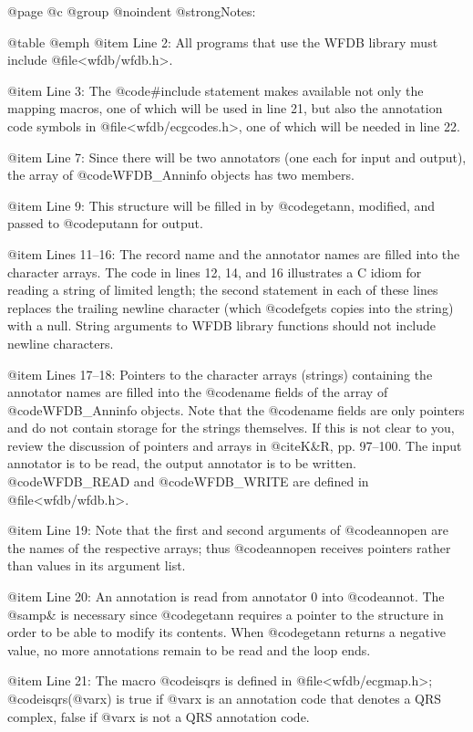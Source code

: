 {{{{{{{{{{@page
@c @group
@noindent
@strong{Notes:}

@table @emph
@item Line 2:
All programs that use the WFDB library must include
@file{<wfdb/wfdb.h>}.

@item Line 3:
The @code{#include} statement makes available not only the mapping
macros, one of which will be used in line 21, but also the
annotation code symbols in @file{<wfdb/ecgcodes.h>}, one of which
will be needed in line 22.

@item Line 7:
Since there will be two annotators (one each for input and output),
the array of @code{WFDB_Anninfo} objects has two members.

@item Line 9:
This structure will be filled in by @code{getann}, modified, and passed
to @code{putann} for output.

@item Lines 11--16:
The record name and the annotator names are filled into the character
arrays.  The code in lines 12, 14, and 16 illustrates a C idiom for
reading a string of limited length; the second statement in each of
these lines replaces the trailing newline character (which @code{fgets}
copies into the string) with a null.  String arguments to WFDB library
functions should not include newline characters.

@item Lines 17--18:
Pointers to the character arrays (strings) containing the annotator
names are filled into the @code{name} fields of the array of
@code{WFDB_Anninfo} objects. Note that the @code{name} fields are only
pointers and do not contain storage for the strings themselves.  If this
is not clear to you, review the discussion of pointers and arrays in
@cite{K&R}, pp.  97--100.  The input annotator is to be read, the output
annotator is to be written.  @code{WFDB_READ} and @code{WFDB_WRITE} are
defined in @file{<wfdb/wfdb.h>}.

@item Line 19:
Note that the first and second arguments of @code{annopen} are
the names of the respective arrays; thus @code{annopen} receives pointers
rather than values in its argument list.

@item Line 20:
An annotation is read from annotator 0 into @code{annot}.
The @samp{&} is necessary since @code{getann} requires a pointer to
the structure in order to be able to modify its contents.  When
@code{getann} returns a negative value, no more annotations remain to be
read and the loop ends.

@item Line 21:
The macro @code{isqrs} is defined in @file{<wfdb/ecgmap.h>};
@code{isqrs(@var{x})} is true if @var{x} is an annotation code that
denotes a QRS complex, false if @var{x} is not a QRS annotation
code.

}}}}}}}}}}
